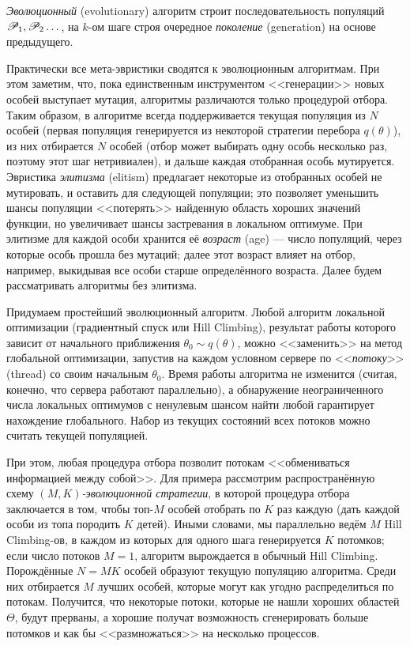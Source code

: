 \begin{definition}
\emph{Эволюционный} (evolutionary) алгоритм строит последовательность популяций $\mathscr{P}_1, \mathscr{P}_2 \dots$, на $k$-ом шаге строя очередное \emph{поколение} (generation) на основе предыдущего.
\end{definition}

Практически все мета-эвристики сводятся к эволюционным алгоритмам. При этом заметим, что, пока единственным инструментом <<генерации>> новых особей выступает мутация, алгоритмы различаются только процедурой отбора. Таким образом, в алгоритме всегда поддерживается текущая популяция из $N$ особей (первая популяция генерируется из некоторой стратегии перебора $q(\theta)$), из них отбирается $N$ особей (отбор может выбирать одну особь несколько раз, поэтому этот шаг нетривиален), и дальше каждая отобранная особь мутируется. Эвристика \emph{элитизма} (elitism) предлагает некоторые из отобранных особей не мутировать, и оставить для следующей популяции; это позволяет уменьшить шансы популяции <<потерять>> найденную область хороших значений функции, но увеличивает шансы застревания в локальном оптимуме. При элитизме для каждой особи хранится её \emph{возраст} (age) --- число популяций, через которые особь прошла без мутаций; далее этот возраст влияет на отбор, например, выкидывая все особи старше определённого возраста. Далее будем рассматривать алгоритмы без элитизма.

Придумаем простейший эволюционный алгоритм. Любой алгоритм локальной оптимизации (градиентный спуск или Hill Climbing), результат работы которого зависит от начального приближения $\theta_0 \sim q(\theta)$, можно <<заменить>> на метод глобальной оптимизации, запустив на каждом условном сервере по <<\emph{потоку}>> (thread) со своим начальным $\theta_0$. Время работы алгоритма не изменится (считая, конечно, что сервера работают параллельно), а обнаружение неограниченного числа локальных оптимумов с ненулевым шансом найти любой гарантирует нахождение глобального. Набор из текущих состояний всех потоков можно считать текущей популяцией.

При этом, любая процедура отбора позволит потокам <<обмениваться информацией между собой>>. Для примера рассмотрим распространённую схему \emph{$(M, K)$-эволюционной стратегии}, в которой процедура отбора заключается в том, чтобы топ-$M$ особей отобрать по $K$ раз каждую (дать каждой особи из топа породить $K$ детей). Иными словами, мы параллельно ведём $M$ Hill Climbing-ов, в каждом из которых для одного шага генерируется $K$ потомков; если число потоков $M = 1$, алгоритм вырождается в обычный Hill Climbing. Порождённые $N = MK$ особей образуют текущую популяцию алгоритма. Среди них отбирается $M$ лучших особей, которые могут как угодно распределиться по потокам. Получится, что некоторые потоки, которые не нашли хороших областей $\Theta$, будут прерваны, а хорошие получат возможность сгенерировать больше потомков и как бы <<размножаться>> на несколько процессов. 

